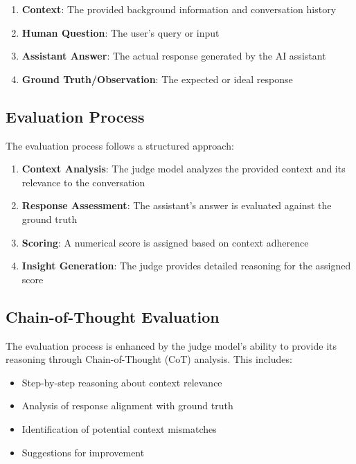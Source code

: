 \documentclass[12pt]{article}
\begin{document}
\begin{enumerate}
    \item \textbf{Context}: The provided background information and conversation history
    \item \textbf{Human Question}: The user's query or input
    \item \textbf{Assistant Answer}: The actual response generated by the AI assistant
    \item \textbf{Ground Truth/Observation}: The expected or ideal response
\end{enumerate}

\subsection{Evaluation Process}

The evaluation process follows a structured approach:

\begin{enumerate}
    \item \textbf{Context Analysis}: The judge model analyzes the provided context and its relevance to the conversation
    \item \textbf{Response Assessment}: The assistant's answer is evaluated against the ground truth
    \item \textbf{Scoring}: A numerical score is assigned based on context adherence
    \item \textbf{Insight Generation}: The judge provides detailed reasoning for the assigned score
\end{enumerate}

\subsection{Chain-of-Thought Evaluation}

The evaluation process is enhanced by the judge model's ability to provide its reasoning through Chain-of-Thought (CoT) analysis. This includes:

\begin{itemize}
    \item Step-by-step reasoning about context relevance
    \item Analysis of response alignment with ground truth
    \item Identification of potential context mismatches
    \item Suggestions for improvement
\end{itemize}
\end{document}
